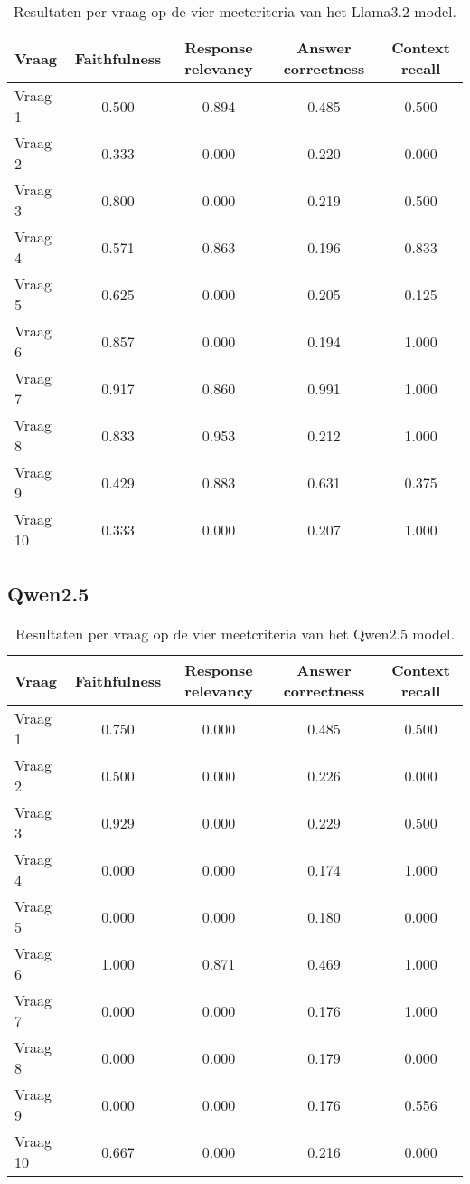 \begin{table}[H]
    \centering
    \begin{tabular}{|l|c|c|c|c|}
        \hline
        \textbf{Vraag} & \textbf{Faithfulness} & \textbf{Response relevancy} & \textbf{Answer correctness} & \textbf{Context recall} \\
        \hline
        Vraag 1  & 0.500 & 0.894 & 0.485 & 0.500 \\
        Vraag 2  & 0.333 & 0.000 & 0.220 & 0.000 \\
        Vraag 3  & 0.800 & 0.000 & 0.219 & 0.500 \\
        Vraag 4  & 0.571 & 0.863 & 0.196 & 0.833 \\
        Vraag 5  & 0.625 & 0.000 & 0.205 & 0.125 \\
        Vraag 6  & 0.857 & 0.000 & 0.194 & 1.000 \\
        Vraag 7  & 0.917 & 0.860 & 0.991 & 1.000 \\
        Vraag 8  & 0.833 & 0.953 & 0.212 & 1.000 \\
        Vraag 9  & 0.429 & 0.883 & 0.631 & 0.375 \\
        Vraag 10 & 0.333 & 0.000 & 0.207 & 1.000 \\
        \hline
    \end{tabular}
    \caption{Resultaten per vraag op de vier meetcriteria van het Llama3.2 model.}
    \label{tab:resultaten_vragen_llama3.2}
\end{table}

\subsection{Qwen2.5}

\begin{table}[H]
    \begin{tabular}{|l|c|c|c|c|}
        \hline
        \textbf{Vraag} & \textbf{Faithfulness} & \textbf{Response relevancy} & \textbf{Answer correctness} & \textbf{Context recall} \\
        \hline
        Vraag 1  & 0.750 & 0.000 & 0.485 & 0.500 \\
        Vraag 2  & 0.500 & 0.000 & 0.226 & 0.000 \\
        Vraag 3  & 0.929 & 0.000 & 0.229 & 0.500 \\
        Vraag 4  & 0.000 & 0.000 & 0.174 & 1.000 \\
        Vraag 5  & 0.000 & 0.000 & 0.180 & 0.000 \\
        Vraag 6  & 1.000 & 0.871 & 0.469 & 1.000 \\
        Vraag 7  & 0.000 & 0.000 & 0.176 & 1.000 \\
        Vraag 8  & 0.000 & 0.000 & 0.179 & 0.000 \\
        Vraag 9  & 0.000 & 0.000 & 0.176 & 0.556 \\
        Vraag 10 & 0.667 & 0.000 & 0.216 & 0.000 \\
        \hline
    \end{tabular}
    \caption{Resultaten per vraag op de vier meetcriteria van het Qwen2.5 model.}
    \label{tab:resultaten_vragen_qwen2.5}
\end{table}


